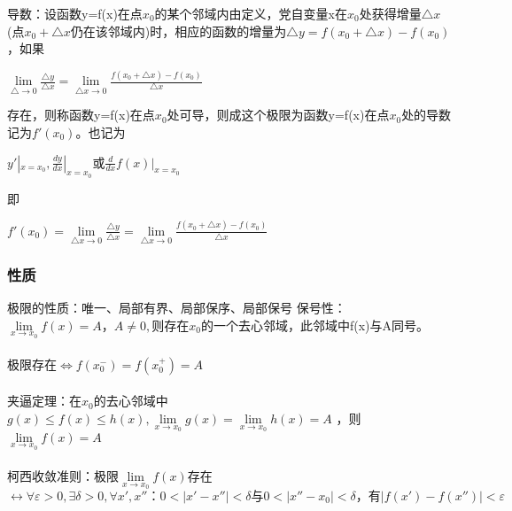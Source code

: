 \documentclass{ctexart}
\begin{document}
导数：设函数y=f(x)在点$x_0$的某个邻域内由定义，党自变量x在$x_0$处获得增量$\bigtriangleup x$(点$x_0+\bigtriangleup x$仍在该邻域内)时，相应的函数的增量为$\bigtriangleup y=f(x_0+\bigtriangleup x)-f(x_0)$，如果

\begin{center}
$\lim\limits_{\bigtriangleup \rightarrow 0} \frac{\bigtriangleup y}{\bigtriangleup x}=\lim\limits_{\bigtriangleup x \rightarrow 0} \frac{f(x_0+\bigtriangleup x)-f(x_0)}{\bigtriangleup x}$
\end{center}

存在，则称函数y=f(x)在点$x_0$处可导，则成这个极限为函数y=f(x)在点$x_0$处的导数记为$f'(x_0)$。也记为

\begin{center}
$y'|_{x=x_0},\frac{dy}{dx}|_{x=x_0}$或$\frac{d}{dx}f(x)|_{x=x_0}$
\end{center}

即

\begin{center}
$f'(x_0)=\lim\limits_{\bigtriangleup x \rightarrow 0}\frac{\bigtriangleup y}{\bigtriangleup x}=\lim\limits_{\bigtriangleup x \rightarrow 0} \frac{f(x_0+\bigtriangleup x)-f(x_0)}{\bigtriangleup x}$
\end{center}


\subsubsection{性质}
极限的性质：唯一、局部有界、局部保序、局部保号
保号性：$\lim\limits_{x\rightarrow x_0}f(x)=A，A\neq 0,$则存在$x_0$的一个去心邻域，此邻域中f(x)与A同号。
\\\\

极限存在$\Leftrightarrow f(x_0^-)=f(x_0^+)=A$
\\\\

夹逼定理：在$x_0$的去心邻域中
$g(x) \leq f(x) \leq h(x),\lim\limits_{x \rightarrow x_0}g(x)=\lim\limits_{x \rightarrow x_0}h(x)=A$
，则
$\lim\limits_{x \rightarrow x_0}f(x)=A$
\\\\

柯西收敛准则：极限$\lim\limits_{x\rightarrow x_0}f(x)$存在$\leftrightarrow \forall \varepsilon >0,\exists \delta >0,\forall x',x''：0<|x'-x''|<\delta 与 0<|x''-x_0|<\delta ，\text{有}|f(x')-f(x'')|<\varepsilon$
\\\\
\end{document}
